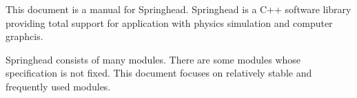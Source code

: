 This document is a manual for Springhead.
Springhead is a C++ software library providing total support for 
application with physics simulation and computer graphcis.

Springhead consists of many modules. 
There are some modules whose specification is not fixed.
This document focuses on relatively stable and frequently used modules.
